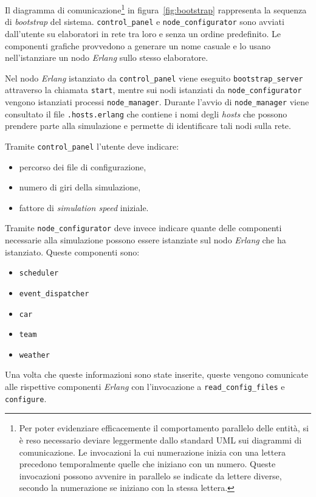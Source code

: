 \documentclass[a4paper]{report}
\newcommand{\Erlang}{\textsl{Erlang}}
\newcommand{\fun}[1]{\texttt{#1}}
\begin{document}
Il diagramma di comunicazione\footnote{Per poter evidenziare efficacemente il comportamento parallelo delle entità, si è reso necessario deviare leggermente dallo standard UML sui diagrammi di comunicazione. Le invocazioni la cui numerazione inizia con una lettera precedono temporalmente quelle che iniziano con un numero. Queste invocazioni possono avvenire in parallelo se indicate da lettere diverse, secondo la numerazione se iniziano con la stessa lettera.} in figura~\ref{fig:bootstrap} rappresenta la sequenza di \textit{bootstrap} del sistema. \texttt{control\_panel} e \texttt{node\_configurator} sono avviati dall'utente su elaboratori in rete tra loro e senza un ordine predefinito. Le componenti grafiche provvedono a generare un nome casuale e lo usano nell'istanziare un nodo \Erlang{} sullo stesso elaboratore.

Nel nodo \Erlang{} istanziato da \texttt{control\_panel} viene eseguito \texttt{bootstrap\_server} attraverso la chiamata \fun{start}, mentre sui nodi istanziati da \texttt{node\_configurator} vengono istanziati processi \texttt{node\_manager}. Durante l'avvio di \texttt{node\_manager} viene consultato il file \texttt{.hosts.erlang} che contiene i nomi degli \textit{hosts} che possono prendere parte alla simulazione e permette di identificare tali nodi sulla rete.

Tramite \texttt{control\_panel} l'utente deve indicare:
\begin{itemize}
\item percorso dei file di configurazione,
\item numero di giri della simulazione,
\item fattore di \textit{simulation speed} iniziale.
\end{itemize}

Tramite \texttt{node\_configurator} deve invece indicare quante delle componenti necessarie alla simulazione possono essere istanziate sul nodo \Erlang{} che ha istanziato. Queste componenti sono:
\begin{itemize}
\item \texttt{scheduler}
\item \texttt{event\_dispatcher}
\item \texttt{car}
\item \texttt{team}
\item \texttt{weather}
\end{itemize}

Una volta che queste informazioni sono state inserite, queste vengono comunicate alle rispettive componenti \Erlang{} con l'invocazione a \fun{read\_config\_files} e \fun{configure}.
\end{document}
